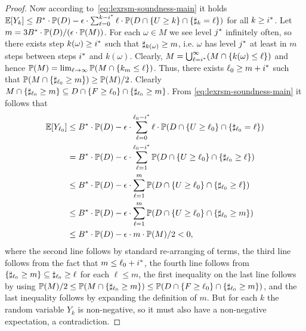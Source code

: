 \begin{proof}
Now according to~\eqref{eq:lexrsm-soundness-main} it holds  $\mathbb{E}[Y_k]\leq {B}^*\cdot \mathbb{P}(D) - \epsilon\cdot\sum_{\ell=0}^{k-{i}^*} \ell\cdot\mathbb{P}(D 
\cap \{U\geq k\} \cap \{\sharp_k 
= 
\ell\})$ for all $k\geq {i}^*$. Let $m=3{B}^*\cdot \mathbb{P}(D)/(\epsilon\cdot \mathbb{P}(M))$. For each $\omega\in M$ we see level ${j}^*$ infinitely often, so there exists step $k(\omega)\geq {i}^*$ such that $\sharp_{k(\omega)}\geq m$, i.e. $\omega$ has level ${j}^* $ at least in $m$ steps between steps ${i}^*$ and $k(\omega)$. Clearly, $M = \bigcup_{\ell={i}^*}^{\infty} (M \cap \{k(\omega) \leq \ell\})$ and hence $\mathbb{P}(M)=\lim_{\ell\rightarrow \infty}\mathbb{P}(M \cap \{k_{m} \leq \ell\})$. Thus, there exists $\ell_0 \geq m+{i}^*$ such that $\mathbb{P}(M \cap \{\sharp_{\ell_0}\geq m\}) \geq \mathbb{P}(M)/2$. Clearly $M \cap \{\sharp_{\ell_0}\geq m\} \subseteq D\cap \{F\geq \ell_0 \} \cap \{\sharp_{\ell_0}\geq m \}$. From \eqref{eq:lexrsm-soundness-main} it follows that
\begin{align*}
\mathbb{E}[Y_{\ell_0}]&\leq {B}^*\cdot \mathbb{P}(D) - \epsilon\cdot\sum_{\ell=0}^{\ell_0-{i}^*} \ell\cdot\mathbb{P}(D 
\cap \{U\geq \ell_0\} \cap \{\sharp_{\ell_0} 
=
\ell\}) \\
&= {B}^*\cdot \mathbb{P}(D) - \epsilon\cdot \sum_{\ell=1}^{\ell_0-{i}^*} \mathbb{P}(D 
\cap \{U\geq \ell_0\} \cap \{\sharp_{\ell_0} 
\geq 
\ell\})\\
& \leq {B}^*\cdot \mathbb{P}(D) - \epsilon\cdot \sum_{\ell=1}^{m} \mathbb{P}(D 
\cap \{U\geq \ell_0\} \cap \{\sharp_{\ell_0} 
\geq 
\ell\}) \\&\leq {B}^*\cdot \mathbb{P}(D) - \epsilon\cdot \sum_{\ell=1}^{m} \mathbb{P}(D 
\cap \{U\geq \ell_0\} \cap \{\sharp_{\ell_0} 
\geq 
m\})\\
&\leq {B}^*\cdot \mathbb{P}(D) - \epsilon\cdot m \cdot \mathbb{P}(M)/2 < 0, 
\end{align*}where the second line follows by standard re-arranging of terms, the third line follows from the fact that $m\leq \ell_0 + {i}^*$, the fourth line follows from $\{\sharp_{\ell_0} 
\geq 
m \} \subseteq \sharp_{\ell_0} 
\geq 
\ell$ for each $\ell \leq m$, the first inequality on the last line follows by  using $\mathbb{P}(M)/2\leq \mathbb{P}(M \cap \{\sharp_{\ell_0}\geq m\}) \leq \mathbb{P}(D\cap \{F\geq \ell_0 \} \cap \{\sharp_{\ell_0}\geq m \})$, and
the last inequality follows by expanding the definition of $m$. But for each $k$ the random variable $Y_k$ is non-negative, so it must also have a non-negative expectation, a contradiction.


	


% 
\end{proof}

